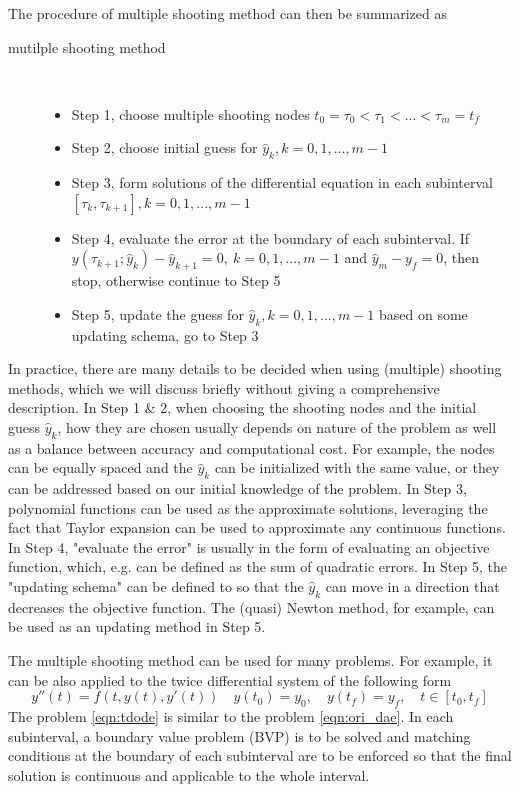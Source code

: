 \documentclass  [
  paper    = a4,
  BCOR     = 10mm,
  twoside,
  fontsize = 12pt,
  fleqn,
  toc      = bibnumbered,
  toc      = listofnumbered,
  numbers  = noendperiod,
  headings = normal,
  listof   = leveldown,
  version  = 3.03
]                                       {scrreprt}
\newcommand{\<}{\langle}
\renewcommand{\>}{\rangle}
\begin{document}
The procedure of multiple shooting method can then be summarized as
\begin{description}
	\item[mutilple shooting method] \
	\begin{itemize}
		\item Step 1, choose multiple shooting nodes $t_0 = \tau_0 < \tau_1 < ... < \tau_m = t_f$ 
		\item Step 2, choose initial guess for $\hat{y}_k, k = 0, 1, ..., m-1$ 
		\item Step 3, form solutions of the differential equation in each subinterval $[\tau_k, \tau_{k+1}], k = 0, 1, ..., m-1$
		\item Step 4, evaluate the error at the boundary of each subinterval. If $y(\tau_{k+1}; \hat{y}_k) - \hat{y}_{k+1} = 0, \  k = 0, 1, ..., m-1$ and $\hat{y}_{m} - y_f =0$, then stop, otherwise continue to Step 5
		\item Step 5, update the guess for $\hat{y}_k, k = 0, 1, ..., m-1$ based on some updating schema, go to Step 3
	\end{itemize}
\end{description}

In practice, there are many details to be decided when using (multiple) shooting methods, which we will discuss briefly without giving a comprehensive description. In Step 1 \& 2, when choosing the shooting nodes and the initial guess $\hat{y}_k$, how they are chosen usually depends on nature of the problem as well as a balance between accuracy and computational cost. For example, the nodes can be equally spaced and the $\hat{y}_k$ can be initialized with the same value, or they can be addressed based on our initial knowledge of the problem. In Step 3, polynomial functions can be used as the approximate solutions, leveraging the fact that Taylor expansion can be used to approximate any continuous functions. In Step 4, "evaluate the error" is usually in the form of evaluating an objective function, which, e.g. can be defined as the sum of quadratic errors. In Step 5, the "updating schema" can be defined to so that the $\hat{y}_k$ can move in a direction that decreases the objective function. The (quasi) Newton method, for example, can be used as an updating method in Step 5. 


The multiple shooting method can be used for many problems. For example, it can be also  applied to the twice differential system of the following form 
\begin{equation}
	y''(t) = f(t, y(t), y'(t))  \quad y(t_0) = y_0, \quad y(t_f) = y_f,  \quad t \in [t_0, t_f]
	\label{eqn:tdode}
\end{equation}
The problem \ref{eqn:tdode} is similar to the problem \ref{eqn:ori_dae}. In each subinterval, a boundary value problem (BVP) is to be solved and matching conditions at the boundary of each subinterval are to be enforced so that the final solution is continuous and applicable to the whole interval. 
\end{document}
